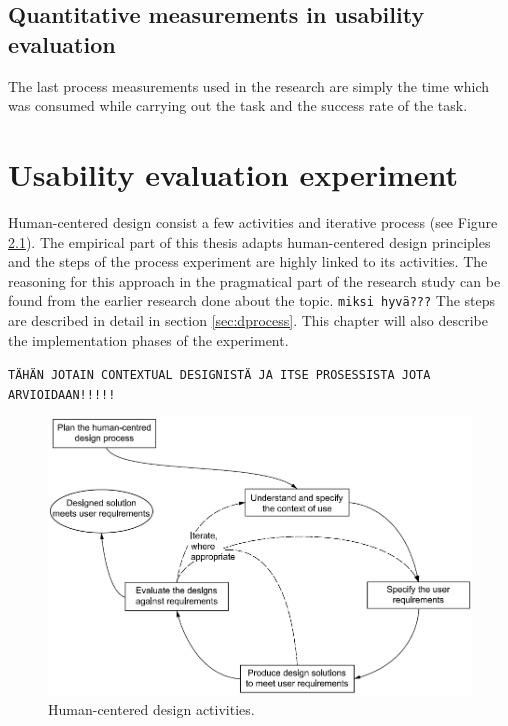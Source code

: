 \documentclass[12pt,a4paper,oneside,pdftex]{report}
\begin{document}
	

\section{Quantitative measurements in usability evaluation}
\label{sec:other}
The last process measurements used in the research are simply the time which was consumed while carrying out the task and the success rate of the task.


 
    
\chapter{Usability evaluation experiment}
\label{experiment}

Human-centered design consist a few activities and iterative process (see Figure \ref{fig:hci_process}). \cite{RefWorks:16} The empirical part of this thesis adapts human-centered design principles and the steps of the process experiment are highly linked to its activities. The reasoning for this approach in the pragmatical part of the research study can be found from the earlier research done about the topic. \texttt{miksi hyvä???} 
The steps are described in detail in section \ref{sec:dprocess}. This chapter will also describe the implementation phases of the experiment. 

\texttt{TÄHÄN JOTAIN CONTEXTUAL DESIGNISTÄ JA ITSE PROSESSISTA JOTA ARVIOIDAAN!!!!!}

\begin{figure}[H]
  	\centering
    	\includegraphics[width=1.0\textwidth]{./images/hci_process.png}
  	\caption{Human-centered design activities.\cite{RefWorks:16}}
	\label{fig:hci_process}
\end{figure}
\end{document}
